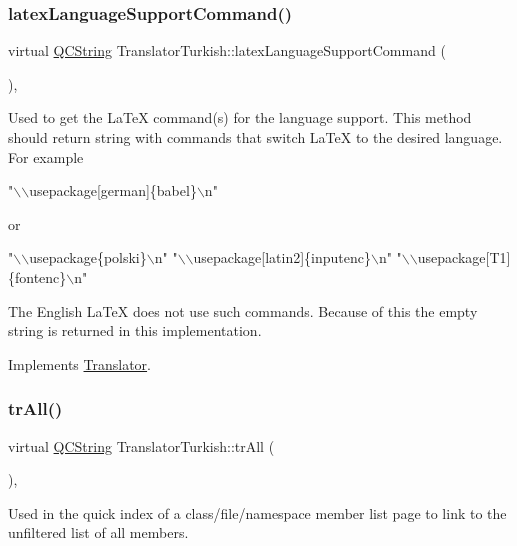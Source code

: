\subsubsection{\texorpdfstring{latexLanguageSupportCommand()}{latexLanguageSupportCommand()}}
{\footnotesize\ttfamily virtual \mbox{\hyperlink{class_q_c_string}{Q\+C\+String}} Translator\+Turkish\+::latex\+Language\+Support\+Command (\begin{DoxyParamCaption}{ }\end{DoxyParamCaption})\hspace{0.3cm}{\ttfamily [inline]}, {\ttfamily [virtual]}}

Used to get the La\+TeX command(s) for the language support. This method should return string with commands that switch La\+TeX to the desired language. For example 
\begin{DoxyPre}"\(\backslash\)\(\backslash\)usepackage[german]\{babel\}\(\backslash\)n"
 \end{DoxyPre}
 or 
\begin{DoxyPre}"\(\backslash\)\(\backslash\)usepackage\{polski\}\(\backslash\)n"
 "\(\backslash\)\(\backslash\)usepackage[latin2]\{inputenc\}\(\backslash\)n"
 "\(\backslash\)\(\backslash\)usepackage[T1]\{fontenc\}\(\backslash\)n"
 \end{DoxyPre}


The English La\+TeX does not use such commands. Because of this the empty string is returned in this implementation. 

Implements \mbox{\hyperlink{class_translator}{Translator}}.

\mbox{\label{class_translator_turkish_ad31169de324d488b6a4cb12896d44501}} 
\subsubsection{\texorpdfstring{trAll()}{trAll()}}
{\footnotesize\ttfamily virtual \mbox{\hyperlink{class_q_c_string}{Q\+C\+String}} Translator\+Turkish\+::tr\+All (\begin{DoxyParamCaption}{ }\end{DoxyParamCaption})\hspace{0.3cm}{\ttfamily [inline]}, {\ttfamily [virtual]}}

Used in the quick index of a class/file/namespace member list page to link to the unfiltered list of all members. 

